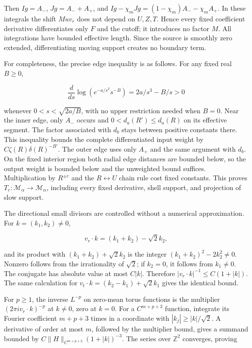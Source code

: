 \documentclass[10pt,a4paper]{article}
\begin{document}
Then \(Ig=A_-\), \(Jg=A_-+A_+\), and \(Ig-\chi_mJg=(1-\chi_m)A_--\chi_mA_+\). In these integrals the shift \(Muv_r\) does not depend on \(U,Z,T\). Hence every fixed coefficient derivative differentiates only \(F\) and the cutoff; it introduces no factor \(M\). All integrations have bounded effective length. Since the source is smoothly zero extended, differentiating moving support creates no boundary term.

For completeness, the precise edge inequality is as follows. For any fixed real \(B\ge0\),

\[
\frac{d}{ds}\log(e^{-a/s^2}s^{-B})=2a/s^3-B/s>0
\]

whenever \(0<s<\sqrt{2a/B}\), with no upper restriction needed when \(B=0\). Near the inner edge, only \(A_-\) occurs and \(0<d_a(R')\le d_a(R)\) on its effective segment. The factor associated with \(d_b\) stays between positive constants there. This inequality bounds the complete differentiated input weight by \(C\zeta(R)\delta(R)^{-B'}\). The outer edge uses only \(A_+\) and the same argument with \(d_b\). On the fixed interior region both radial edge distances are bounded below, so the output weight is bounded below and the unweighted bound suffices. Multiplication by \(R^{\pm e}\) and the \(R\leftrightarrow U\) chain rule cost fixed constants. This proves \(T_e:\mathcal M_\alpha\to\mathcal M_\alpha\), including every fixed derivative, shell support, and projection of slow support.

The directional small divisors are controlled without a numerical approximation. For \(k=(k_1,k_2)\ne0\),

\[
v_r\cdot k=(k_1+k_2)-\sqrt2 k_2,
\]

and its product with \((k_1+k_2)+\sqrt2 k_2\) is the integer \((k_1+k_2)^2-2k_2^2\ne0\). Nonzero follows from the irrationality of \(\sqrt2\); if \(k_2=0\), it follows from \(k_1\ne0\). The conjugate has absolute value at most \(C|k|\). Therefore \(|v_r\cdot k|^{-1}\le C(1+|k|)\). The same calculation for \(v_t\cdot k=(k_2-k_1)+\sqrt2 k_1\) gives the identical bound.

For \(p\ge1\), the inverse \(L^{-p}\) on zero-mean torus functions is the multiplier \((2\pi i v_r\cdot k)^{-p}\) at \(k\ne0\), zero at \(k=0\). For a \(C^{m+p+3}\) function, integrate its Fourier coefficient \(m+p+3\) times in a coordinate with \(|k_j|\ge |k|/\sqrt2\). A derivative of order at most \(m\), followed by the multiplier bound, gives a summand bounded by \(C\|H\|_{C^{m+p+3}}(1+|k|)^{-3}\). The series over \(\mathbb Z^2\) converges, proving
\end{document}
